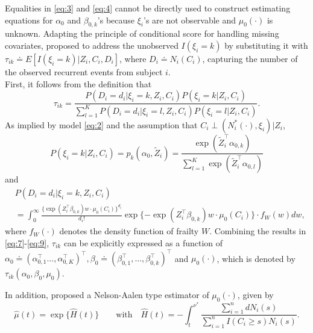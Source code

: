 Equalities in \eqref{eq:3} and \eqref{eq:4} cannot be directly used to construct
estimating equations for \(\alpha_0\) and \(\beta_{0,k}\)'s because
\(\xi _{i}\)'s are not observable and \(\mu_0(\cdot)\) is unknown. Adapting the principle of
conditional score \citep{stefanski1987conditional} for handling missing covariates, \citet{zhao2022semiparametric} proposed to address the unobserved \(I(\xi _i = k )\) by substituting it with \(\tau _{ik} \doteq E[I(\xi _i = k) | Z_i, C_i, D_i]\), where \(D_i \doteq N_i(C_i)\), capturing the number of the observed recurrent events from subject \(i\).\\
First, it follows from the definition that
\begin{equation}
\label{eq:7}
\tau _{ik} = \frac{P(D_{i} = d_{i} | \xi _{i} = k, Z _{i}, C_{i}) P(\xi _{i} = k | Z_{i}, C_{i})}{\sum _{l = 1} ^{K} P(D_{i} = d_{i} | \xi _{i} = l, Z _{i}, C_{i}) P(\xi _{i} = l | Z_{i}, C_{i})}. 
\end{equation}
As implied by model \eqref{eq:2} and the assumption that
\(C_i \perp (N^{*} _i (\cdot) , \xi _i ) | Z_i\),
\begin{equation}
\label{eq:8}
P(\xi _i = k | Z_i, C_i) = p_k (\alpha _0, \tilde{Z} _i) = \frac{\exp(\tilde{Z} _{i} ^{\top} \alpha _{0,k})}{\sum _{l = 1} ^{K} \exp(\tilde{Z} _{i} ^{\top} \alpha _{0,l})} 
\end{equation}
and
\begin{align} 
\label{eq:9}
&P ( D _{i} = d_{i} | \xi _{i} = k , Z _{i}, C _{i})\\\nonumber
&= \int _{0} ^{\infty} \frac{ \{\exp(Z_{i} ^{\top} \beta _{0,k}) w \cdot \mu_{0}(C _{i}) \} ^{d_{i}} }{d_{i} !} \exp \{ - \exp(Z_{i} ^{\top} \beta _{0,k}) w \cdot \mu _{0} (C _{i}) \} \cdot f _{W} (w) dw,   
\end{align}
where \(f_W (\cdot)\) denotes the density function of frailty \(W\).
Combining the results in \eqref{eq:7}-\eqref{eq:9}, \(\tau_{ik}\) can be explicitly expressed as a function of \(\alpha_0\doteq (\alpha_{0,1}^\top\ldots, \alpha_{0, K}^\top)^\top, \beta_0\doteq (\beta_{0,1}^\top,\ldots, \beta_{0,k}^\top)^\top\) and \(\mu_0(\cdot)\), which is denoted by \(\tau_{ik}(\alpha_0, \beta_0, \mu_0)\).

In addition, \citet{zhao2022semiparametric} proposed a
Nelson-Aalen type estimator of \(\mu_0(\cdot)\), given by
\begin{equation} 
\label{eq:10}
\hat{\mu}(t) = \exp \{  \hat{H}(t) \} \qquad \text{with} \quad \hat{H}(t) = - \int _{t} ^{\nu ^{*}} \frac{\sum _{i = 1} ^{n} d N_i(s)}{\sum _{i = 1} ^{n} I(C_i \ge s) N_i (s)}.  
\end{equation}

